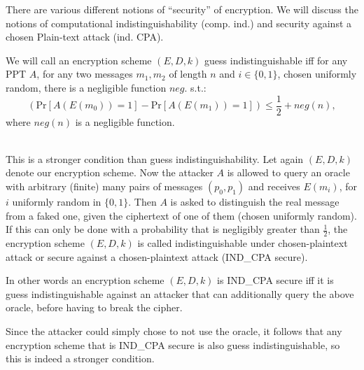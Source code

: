 There are various different notions of ``security'' of encryption. We will discuss the notions of %
computational indistinguishability (comp. ind.) and security against a chosen Plain-text attack (ind. CPA). 
\begin{definition}
  We will call an encryption scheme $(E,D,k)$ guess indistinguishable iff for any PPT $A$, for any two messages $m_1, m_2$ of length $n$ and $i\in \{0,1\}$, chosen uniformly random, there is a negligible function $neg.$ s.t.:
  \[(\mathrm{Pr}\left[A(E(m_0))=1\right]-\mathrm{Pr}\left[A(E(m_1))=1\right])\leq \frac{1}{2}+neg(n), \] where $neg(n)$ is a negligible function.
\end{definition}
\begin{definition}\ \\
  This is a stronger condition than guess indistinguishability. 
  Let again $(E, D, k)$ denote our encryption scheme. 
  Now the attacker $A$ is allowed to query an oracle with arbitrary (finite) many pairs of messages $(p_0, p_1)$ and receives $E(m_i)$, for $i$ uniformly random in $\{0,1\}$. Then $A$ is asked to distinguish the real message from a faked one, given the ciphertext of one of them (chosen uniformly random). If this can only be done with a probability that is negligibly greater than $\frac{1}{2}$, the encryption scheme $(E, D, k)$ is called indistinguishable under chosen-plaintext attack or secure against a chosen-plaintext attack (IND\_CPA secure). 
  
  In other words an encryption scheme $(E, D, k)$ is IND\_CPA secure iff it is guess indistinguishable against an attacker that can additionally query the above oracle, before having to break the cipher. 
  
  Since the attacker could simply chose to not use the oracle, it follows that any encryption scheme that is IND\_CPA secure is also guess indistinguishable, so this is indeed a stronger condition. 
\end{definition}

